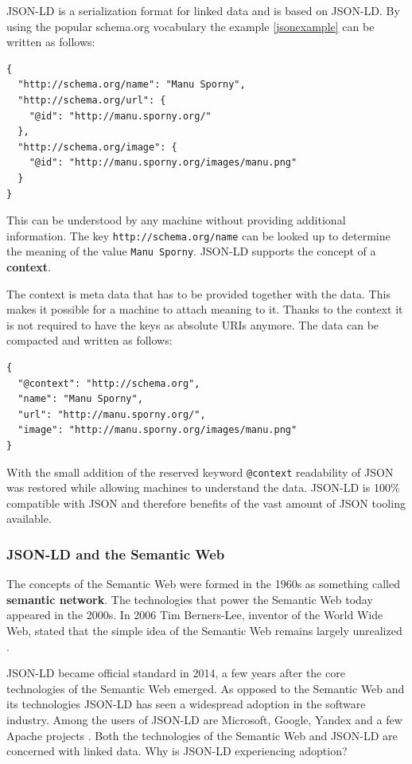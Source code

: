JSON-LD is a serialization format for linked data and is based on JSON-LD. By using the popular schema.org vocabulary the example \ref{jsonexample} can be written as follows:

\lstset{language=JSON}
\begin{lstlisting}[caption=Data of a person in the JSON-LD format, label=jsonldexample]
{
  "http://schema.org/name": "Manu Sporny",
  "http://schema.org/url": {
    "@id": "http://manu.sporny.org/"
  },
  "http://schema.org/image": {
    "@id": "http://manu.sporny.org/images/manu.png"
  }
}
\end{lstlisting}

This can be understood by any machine without providing additional information. The key \lstinline{http://schema.org/name} can be looked up to determine the meaning of the value \lstinline{Manu Sporny}. JSON-LD supports the concept of a \textbf{context}.

The context is meta data that has to be provided together with the data. This makes it possible for a machine to attach meaning to it. Thanks to the context it is not required to have the keys as absolute URIs anymore. The data can be compacted and written as follows:

\lstset{language=JSON}
\begin{lstlisting}[caption=Compacted data of a person, label=jsonldcompacted]
{
  "@context": "http://schema.org",
  "name": "Manu Sporny",
  "url": "http://manu.sporny.org/",
  "image": "http://manu.sporny.org/images/manu.png"
}
\end{lstlisting}

With the small addition of the reserved keyword \lstinline{@context} readability of JSON was restored while allowing machines to understand the data. JSON-LD is 100\% compatible with JSON and therefore benefits of the vast amount of JSON tooling available.


\subsubsection{JSON-LD and the Semantic Web}
The concepts of the Semantic Web were formed in the 1960s as something called \textbf{semantic network}. The technologies that power the Semantic Web today appeared in the 2000s. In 2006 Tim Berners-Lee, inventor of the World Wide Web, stated that the simple idea of the Semantic Web remains largely unrealized \citep{semanticwebrevisited}.

JSON-LD became official standard in 2014, a few years after the core technologies of the Semantic Web emerged. As opposed to the Semantic Web and its technologies JSON-LD has seen a widespread adoption in the software industry. Among the users of JSON-LD are Microsoft, Google, Yandex and a few Apache projects \citep{jsonldusers}. Both the technologies of the Semantic Web and JSON-LD are concerned with linked data. Why is JSON-LD experiencing adoption?

